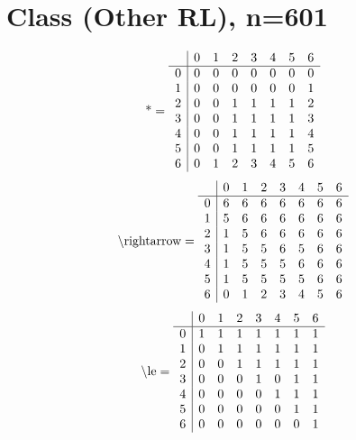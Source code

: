 \documentclass[11pt]{article}
\begin{document}
\section{Class (Other RL), n=601}
\[\text{*} = 
\begin{array}{r | r r r r r r r}
 & 0 & 1 & 2 & 3 & 4 & 5 & 6 \\ \hline
0 & 0 & 0 & 0 & 0 & 0 & 0 & 0 \\
1 & 0 & 0 & 0 & 0 & 0 & 0 & 1 \\
2 & 0 & 0 & 1 & 1 & 1 & 1 & 2 \\
3 & 0 & 0 & 1 & 1 & 1 & 1 & 3 \\
4 & 0 & 0 & 1 & 1 & 1 & 1 & 4 \\
5 & 0 & 0 & 1 & 1 & 1 & 1 & 5 \\
6 & 0 & 1 & 2 & 3 & 4 & 5 & 6 \\
\end{array}
\]
\[\text{\textbackslash rightarrow} = 
\begin{array}{r | r r r r r r r}
 & 0 & 1 & 2 & 3 & 4 & 5 & 6 \\ \hline
0 & 6 & 6 & 6 & 6 & 6 & 6 & 6 \\
1 & 5 & 6 & 6 & 6 & 6 & 6 & 6 \\
2 & 1 & 5 & 6 & 6 & 6 & 6 & 6 \\
3 & 1 & 5 & 5 & 6 & 5 & 6 & 6 \\
4 & 1 & 5 & 5 & 5 & 6 & 6 & 6 \\
5 & 1 & 5 & 5 & 5 & 5 & 6 & 6 \\
6 & 0 & 1 & 2 & 3 & 4 & 5 & 6 \\
\end{array}
\]
\[\text{\textbackslash le} = 
\begin{array}{r | r r r r r r r}
 & 0 & 1 & 2 & 3 & 4 & 5 & 6 \\ \hline
0 & 1 & 1 & 1 & 1 & 1 & 1 & 1 \\
1 & 0 & 1 & 1 & 1 & 1 & 1 & 1 \\
2 & 0 & 0 & 1 & 1 & 1 & 1 & 1 \\
3 & 0 & 0 & 0 & 1 & 0 & 1 & 1 \\
4 & 0 & 0 & 0 & 0 & 1 & 1 & 1 \\
5 & 0 & 0 & 0 & 0 & 0 & 1 & 1 \\
6 & 0 & 0 & 0 & 0 & 0 & 0 & 1 \\
\end{array}
\]
\end{document}
